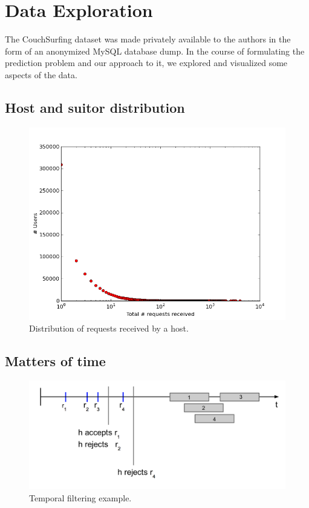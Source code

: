 \section{Data Exploration}

The CouchSurfing dataset was made privately available to the authors in the form of an anonymized MySQL database dump.
In the course of formulating the prediction problem and our approach to it, we explored and visualized some aspects of the data.

\subsection{Host and suitor distribution}

\begin{figure}[ht]
\centering
\includegraphics[width=1\linewidth]{figures/req_received_dist.png}
\caption{Distribution of requests received by a host.}
\label{fig:requests_distribution}
\end{figure}

\subsection{Matters of time}

\begin{figure}[ht]
\centering
\includegraphics[width=1\linewidth]{figures/temporal_filtering.png}
\caption{Temporal filtering example.}
\label{fig:temporal_filtering}
\end{figure}

